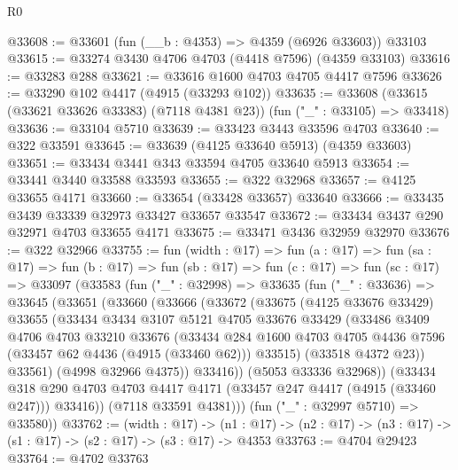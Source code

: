\begin{lexlean}{R0}
\begin{coremodule}
@33608 := @33601 (fun (__b : @4353) => @4359 (@6926 @33603)) @33103
@33615 := @33274 @3430 @4706 @4703 (@4418 @7596) (@4359 @33103)
@33616 := @33283 @288
@33621 := @33616 @1600 @4703 @4705 @4417 @7596
@33626 := @33290 @102 @4417 (@4915 (@33293 @102))
@33635 := @33608 (@33615 (@33621 @33626 @33383) (@7118 @4381 @23)) (fun ("_" : @33105) => @33418)
@33636 := @33104 @5710
@33639 := @33423 @3443 @33596 @4703
@33640 := @322 @33591
@33645 := @33639 (@4125 @33640 @5913) (@4359 @33603)
@33651 := @33434 @3441 @343 @33594 @4705 @33640 @5913
@33654 := @33441 @3440 @33588 @33593
@33655 := @322 @32968
@33657 := @4125 @33655 @4171
@33660 := @33654 (@33428 @33657) @33640
@33666 := @33435 @3439 @33339 @32973 @33427 @33657 @33547
@33672 := @33434 @3437 @290 @32971 @4703 @33655 @4171
@33675 := @33471 @3436 @32959 @32970
@33676 := @322 @32966
@33755 := fun (width : @17) =>
  fun (a : @17) =>
  fun (sa : @17) =>
  fun (b : @17) =>
  fun (sb : @17) =>
  fun (c : @17) =>
  fun (sc : @17) =>
  @33097
    (@33583
      (fun ("_" : @32998) =>
      @33635
        (fun ("_" : @33636) =>
        @33645
          (@33651
            (@33660
              (@33666
                (@33672
                  (@33675
                    (@4125 @33676 @33429)
                    @33655
                    (@33434
                      @3434
                      @3107
                      @5121
                      @4705
                      @33676
                      @33429
                      (@33486
                        @3409
                        @4706
                        @4703
                        @33210
                        @33676
                        (@33434
                          @284
                          @1600
                          @4703
                          @4705
                          @4436
                          @7596
                          (@33457 @62 @4436 (@4915 (@33460 @62)))
                          @33515)
                        (@33518 @4372 @23))
                      @33561)
                    (@4998 @32966 @4375))
                  @33416))
              (@5053 @33336 @32968))
            (@33434
              @318
              @290
              @4703
              @4703
              @4417
              @4171
              (@33457 @247 @4417 (@4915 (@33460 @247)))
              @33416))
          (@7118 @33591 @4381)))
      (fun ("_" : @32997 @5710) => @33580))
@33762 := (width : @17) ->
  (n1 : @17) -> (n2 : @17) -> (n3 : @17) -> (s1 : @17) -> (s2 : @17) -> (s3 : @17) -> @4353
@33763 := @4704 @29423
@33764 := @4702 @33763

\end{coremodule}
\end{lexlean}
